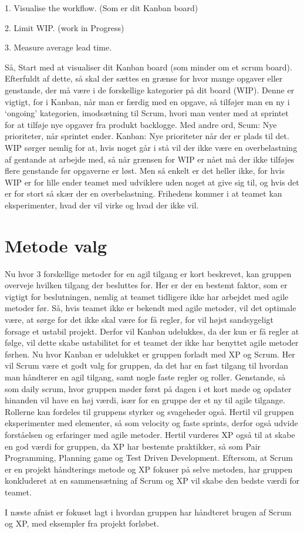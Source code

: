 1. Visualise the workflow. (Som er dit Kanban board)

2. Limit WIP. (work in Progress)

3. Measure average lead time.

Så, Start med at visualiser dit Kanban board (som minder om et scrum board). Efterfuldt af dette, så skal der sættes en grænse for hvor mange opgaver eller genstande, der må være i de forskellige kategorier på dit board (WIP). Denne er vigtigt, for i Kanban, når man er færdig med en opgave, så tilføjer man en ny i ‘ongoing’ kategorien, imodsætning til Scrum, hvori man venter med at sprintet for at tilføje nye opgaver fra produkt backlogge. Med andre ord, Scum: Nye prioriteter, når sprintet ender. Kanban: Nye prioriteter når der er plads til det.\cite{slides} WIP sørger nemlig for at, hvis noget går i stå vil der ikke være en overbelastning af gentande at arbejde med, så når grænsen for WIP er nået må der ikke tilføjes flere genstande før opgaverne er løst. Men så enkelt er det heller ikke, for hvis WIP er for lille ender teamet med udviklere uden noget at give sig til, og hvis det er for stort så skær der en overbelastning. Frihedens kommer i at teamet kan eksperimenter, hvad der vil virke og hvad der ikke vil. 


\section{Metode valg}


Nu hvor 3 forskellige metoder for en agil tilgang er kort beskrevet, kan gruppen overveje hvilken tilgang der besluttes for. Her er der en bestemt faktor, som er vigtigt for beslutningen, nemlig at teamet tidligere ikke har arbejdet med agile metoder før. Så, hvis teamet ikke er bekendt med agile metoder, vil det optimale være, at sørge for det ikke skal være for få regler, for vil højst sandsygeligt forsage et ustabil projekt. Derfor vil Kanban udelukkes, da der kun er få regler at følge, vil dette skabe ustabilitet for et teamet der ikke har benyttet agile metoder førhen. Nu hvor Kanban er udelukket er gruppen forladt med XP og Scrum. Her vil Scrum være et godt valg for gruppen, da det har en fast tilgang til hvordan man håndterer en agil tilgang, samt nogle faste regler og roller. Genstande, så som daily scrum, hvor gruppen møder først på dagen i et kort møde og opdater hinanden vil have en høj værdi, især for en gruppe der et ny til agile tilgange. Rollerne kan fordeles til gruppens styrker og svageheder også. Hertil vil gruppen eksperimenter med elementer, så som velocity og faste sprints, derfor også udvide forståelsen og erfaringer med agile metoder. Hertil vurderes XP også til at skabe en god værdi for gruppen, da XP har bestemte praktikker, så som Pair Programming, Planning game og Test Driven Development. Eftersom, at Scrum er en projekt håndterings metode og XP fokuser på selve metoden, har gruppen konkluderet at en sammensætning af Scrum og XP vil skabe den bedste værdi for teamet. 

I næste afnist er fokuset lagt i hvordan gruppen har håndteret brugen af Scrum og XP, med eksempler fra projekt forløbet. 

